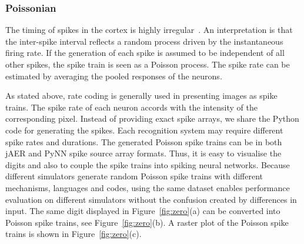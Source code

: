 \subsubsection{Poissonian}
\label{sec:poissonian}
The timing of spikes in the cortex is highly irregular~\cite{squire1998findings}.
An interpretation is that the inter-spike interval reflects a random process driven by the instantaneous firing rate.
If the generation of each spike is assumed to be independent of all other spikes, the spike train is seen as a Poisson process.
The spike rate can be estimated by averaging the pooled responses of the neurons.


As stated above, rate coding is generally used in presenting images as spike trains.
The spike rate of each neuron accords with the intensity of the corresponding pixel.
Instead of providing exact spike arrays, we share the Python code for generating the spikes.
Each recognition system may require different spike rates and durations.
The generated Poisson spike trains can be in both jAER and PyNN spike source array formats.
Thus, it is easy to visualise the digits and also to couple the spike trains into spiking neural networks.
Because different simulators generate random Poisson spike trains with different mechanisms, languages and codes, using the same dataset enables performance evaluation on different simulators without the confusion created by differences in input.
The same digit displayed in Figure~\ref{fig:zero}(a) can be converted into Poisson spike trains, see Figure~\ref{fig:zero}(b).
A raster plot of the Poisson spike trains is shown in Figure~\ref{fig:zero}(c).



